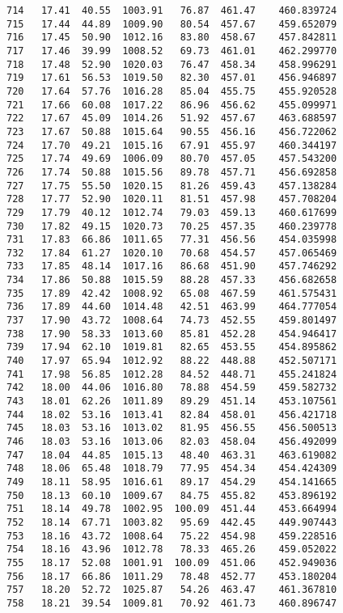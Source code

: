 \documentclass[11pt]{article}
\begin{document}
\begin{tcolorbox}[breakable, size=fbox, boxrule=.5pt, pad at break*=1mm, opacityfill=0]
\begin{Verbatim}[commandchars=\\\{\}]
714   17.41  40.55  1003.91   76.87  461.47    460.839724
715   17.44  44.89  1009.90   80.54  457.67    459.652079
716   17.45  50.90  1012.16   83.80  458.67    457.842811
717   17.46  39.99  1008.52   69.73  461.01    462.299770
718   17.48  52.90  1020.03   76.47  458.34    458.996291
719   17.61  56.53  1019.50   82.30  457.01    456.946897
720   17.64  57.76  1016.28   85.04  455.75    455.920528
721   17.66  60.08  1017.22   86.96  456.62    455.099971
722   17.67  45.09  1014.26   51.92  457.67    463.688597
723   17.67  50.88  1015.64   90.55  456.16    456.722062
724   17.70  49.21  1015.16   67.91  455.97    460.344197
725   17.74  49.69  1006.09   80.70  457.05    457.543200
726   17.74  50.88  1015.56   89.78  457.71    456.692858
727   17.75  55.50  1020.15   81.26  459.43    457.138284
728   17.77  52.90  1020.11   81.51  457.98    457.708204
729   17.79  40.12  1012.74   79.03  459.13    460.617699
730   17.82  49.15  1020.73   70.25  457.35    460.239778
731   17.83  66.86  1011.65   77.31  456.56    454.035998
732   17.84  61.27  1020.10   70.68  454.57    457.065469
733   17.85  48.14  1017.16   86.68  451.90    457.746292
734   17.86  50.88  1015.59   88.28  457.33    456.682658
735   17.89  42.42  1008.92   65.08  467.59    461.575431
736   17.89  44.60  1014.48   42.51  463.99    464.777054
737   17.90  43.72  1008.64   74.73  452.55    459.801497
738   17.90  58.33  1013.60   85.81  452.28    454.946417
739   17.94  62.10  1019.81   82.65  453.55    454.895862
740   17.97  65.94  1012.92   88.22  448.88    452.507171
741   17.98  56.85  1012.28   84.52  448.71    455.241824
742   18.00  44.06  1016.80   78.88  454.59    459.582732
743   18.01  62.26  1011.89   89.29  451.14    453.107561
744   18.02  53.16  1013.41   82.84  458.01    456.421718
745   18.03  53.16  1013.02   81.95  456.55    456.500513
746   18.03  53.16  1013.06   82.03  458.04    456.492099
747   18.04  44.85  1015.13   48.40  463.31    463.619082
748   18.06  65.48  1018.79   77.95  454.34    454.424309
749   18.11  58.95  1016.61   89.17  454.29    454.141665
750   18.13  60.10  1009.67   84.75  455.82    453.896192
751   18.14  49.78  1002.95  100.09  451.44    453.664994
752   18.14  67.71  1003.82   95.69  442.45    449.907443
753   18.16  43.72  1008.64   75.22  454.98    459.228516
754   18.16  43.96  1012.78   78.33  465.26    459.052022
755   18.17  52.08  1001.91  100.09  451.06    452.949036
756   18.17  66.86  1011.29   78.48  452.77    453.180204
757   18.20  52.72  1025.87   54.26  463.47    461.367810
758   18.21  39.54  1009.81   70.92  461.73    460.896747

\end{Verbatim}
\end{tcolorbox}
\end{document}
